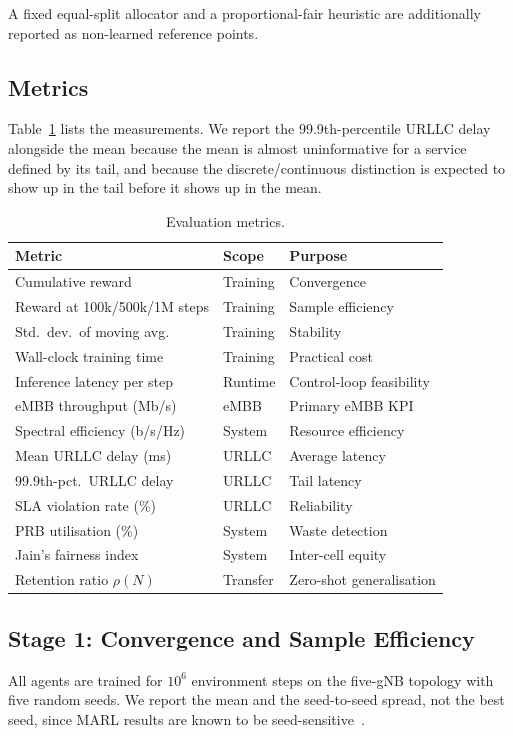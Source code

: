 \documentclass[journal]{IEEEtran}
\begin{document}
A fixed equal-split allocator and a proportional-fair heuristic are
additionally reported as non-learned reference points.
 
\subsection{Metrics}
Table~\ref{tab:metrics} lists the measurements. We report the
99.9th-percentile URLLC delay alongside the mean because the mean is
almost uninformative for a service defined by its tail, and because the
discrete/continuous distinction is expected to show up in the tail
before it shows up in the mean.
 
\begin{table}[!t]
\renewcommand{\arraystretch}{1.2}
\caption{Evaluation metrics.}
\label{tab:metrics}
\centering
\footnotesize
\begin{tabular}{@{}llp{2.6cm}@{}}
\hline
\textbf{Metric} & \textbf{Scope} & \textbf{Purpose} \\
\hline
Cumulative reward           & Training  & Convergence \\
Reward at 100k/500k/1M steps& Training  & Sample efficiency \\
Std.\ dev.\ of moving avg.  & Training  & Stability \\
Wall-clock training time    & Training  & Practical cost \\
Inference latency per step  & Runtime   & Control-loop feasibility \\
eMBB throughput (Mb/s)      & eMBB      & Primary eMBB KPI \\
Spectral efficiency (b/s/Hz)& System    & Resource efficiency \\
Mean URLLC delay (ms)       & URLLC     & Average latency \\
99.9th-pct.\ URLLC delay    & URLLC     & Tail latency \\
SLA violation rate (\%)     & URLLC     & Reliability \\
PRB utilisation (\%)        & System    & Waste detection \\
Jain's fairness index       & System    & Inter-cell equity \\
Retention ratio $\rho(N)$   & Transfer  & Zero-shot generalisation \\
\hline
\end{tabular}
\end{table}
 
\subsection{Stage 1: Convergence and Sample Efficiency}
All agents are trained for $10^6$ environment steps on the five-gNB
topology with five random seeds. We report the mean and the
seed-to-seed spread, not the best seed, since MARL results are known to
be seed-sensitive~\cite{papoudakis2021benchmarking}.
 
\end{document}
